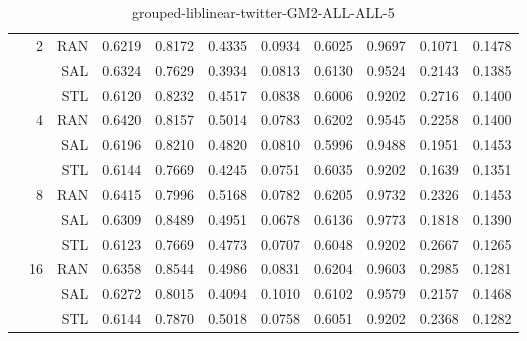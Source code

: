 \begin{center}
\begin{table}[htbp]
\begin{center}
\begin{tabular}{ | r | r | r | r | r | r | r | r | r | r | r |}
 & \multirow{3}{*}{2} & RAN & 0.6219 & 0.8172 & 0.4335 & 0.0934 & 0.6025 & 0.9697 & 0.1071 & 0.1478\\ \cline{3-11}
 &   & SAL & 0.6324 & 0.7629 & 0.3934 & 0.0813 & 0.6130 & 0.9524 & 0.2143 & 0.1385\\ \cline{3-11}
 &   & STL & 0.6120 & 0.8232 & 0.4517 & 0.0838 & 0.6006 & 0.9202 & 0.2716 & 0.1400\\ \cline{2-11}
 & \multirow{3}{*}{4} & RAN & 0.6420 & 0.8157 & 0.5014 & 0.0783 & 0.6202 & 0.9545 & 0.2258 & 0.1400\\ \cline{3-11}
 &   & SAL & 0.6196 & 0.8210 & 0.4820 & 0.0810 & 0.5996 & 0.9488 & 0.1951 & 0.1453\\ \cline{3-11}
 &   & STL & 0.6144 & 0.7669 & 0.4245 & 0.0751 & 0.6035 & 0.9202 & 0.1639 & 0.1351\\ \cline{2-11}
 & \multirow{3}{*}{8} & RAN & 0.6415 & 0.7996 & 0.5168 & 0.0782 & 0.6205 & 0.9732 & 0.2326 & 0.1453\\ \cline{3-11}
 &   & SAL & 0.6309 & 0.8489 & 0.4951 & 0.0678 & 0.6136 & 0.9773 & 0.1818 & 0.1390\\ \cline{3-11}
 &   & STL & 0.6123 & 0.7669 & 0.4773 & 0.0707 & 0.6048 & 0.9202 & 0.2667 & 0.1265\\ \cline{2-11}
 & \multirow{3}{*}{16} & RAN & 0.6358 & 0.8544 & 0.4986 & 0.0831 & 0.6204 & 0.9603 & 0.2985 & 0.1281\\ \cline{3-11}
 &   & SAL & 0.6272 & 0.8015 & 0.4094 & 0.1010 & 0.6102 & 0.9579 & 0.2157 & 0.1468\\ \cline{3-11}
 &   & STL & 0.6144 & 0.7870 & 0.5018 & 0.0758 & 0.6051 & 0.9202 & 0.2368 & 0.1282\\ \cline{2-11}
\hline
\end{tabular}
\caption{grouped-liblinear-twitter-GM2-ALL-ALL-5}
\end{center}
 \end{table}
\end{center}

